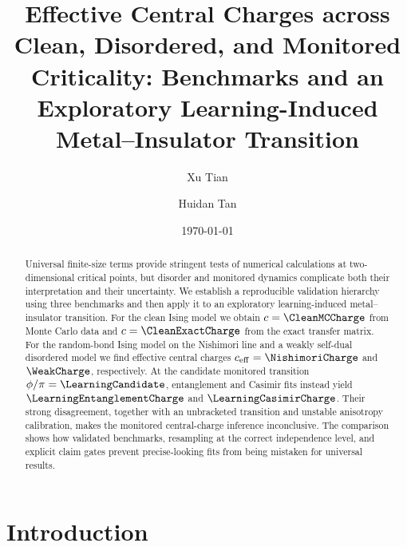 \documentclass[aps,prb,reprint,superscriptaddress,longbibliography,floatfix]{revtex4-2}
\begin{document}
\title{Effective Central Charges across Clean, Disordered, and Monitored
Criticality: Benchmarks and an Exploratory Learning-Induced
Metal--Insulator Transition}

\author{Xu Tian}
\author{Huidan Tan}

\date{\today}

\begin{abstract}
Universal finite-size terms provide stringent tests of numerical calculations at
two-dimensional critical points, but disorder and monitored dynamics complicate
both their interpretation and their uncertainty.  We establish a reproducible
validation hierarchy using three benchmarks and then apply it to an exploratory
learning-induced metal--insulator transition.  For the clean Ising model we
obtain $c=\CleanMCCharge$ from Monte Carlo data and
$c=\CleanExactCharge$ from the exact transfer matrix.  For the random-bond
Ising model on the Nishimori line and a weakly self-dual disordered model we
find effective central charges $c_{\rm eff}=\NishimoriCharge$ and
$\WeakCharge$, respectively.  At the candidate monitored transition
$\phi/\pi=\LearningCandidate$, entanglement and Casimir fits instead yield
$\LearningEntanglementCharge$ and $\LearningCasimirCharge$.  Their strong
disagreement, together with an unbracketed transition and unstable anisotropy
calibration, makes the monitored central-charge inference inconclusive.  The
comparison shows how validated benchmarks, resampling at the correct
independence level, and explicit claim gates prevent precise-looking fits from
being mistaken for universal results.
\end{abstract}

\maketitle

\section{Introduction}
\label{sec:introduction}
\end{document}
